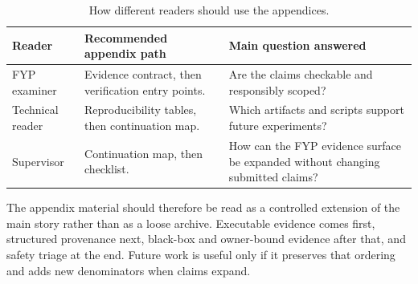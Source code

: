\begin{table}[htbp]
\centering
\caption{How different readers should use the appendices.}
\label{tab:appendix-reading-guide}
\tighttable
\begin{tabularx}{\textwidth}{@{}L{2.05cm}YY@{}}
\toprule
Reader & Recommended appendix path & Main question answered \\
\midrule
FYP examiner & Evidence contract, then verification entry points. & Are the claims checkable and responsibly scoped? \\
Technical reader & Reproducibility tables, then continuation map. & Which artifacts and scripts support future experiments? \\
Supervisor & Continuation map, then checklist. & How can the FYP evidence surface be expanded without changing submitted claims? \\
\bottomrule
\end{tabularx}
\end{table}

The appendix material should therefore be read as a controlled extension of the main story rather than as a loose archive. Executable evidence comes first, structured provenance next, black-box and owner-bound evidence after that, and safety triage at the end. Future work is useful only if it preserves that ordering and adds new denominators when claims expand.
